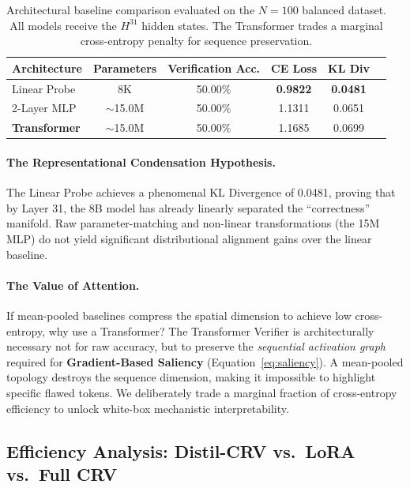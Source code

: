 \documentclass{article}
\begin{document}
\begin{table}[ht]
\centering
\caption{Architectural baseline comparison evaluated on the $N=100$ balanced dataset. All models receive the $H^{31}$ hidden states. The Transformer trades a marginal cross-entropy penalty for sequence preservation.}
\label{tab:architectural_baselines}
\vspace{3pt}
\begin{tabular}{@{}lccccc@{}}
\toprule
\textbf{Architecture} & \textbf{Parameters} & \textbf{Verification Acc.} & \textbf{CE Loss} & \textbf{KL Div} \\ \midrule
Linear Probe & 8K & 50.00\% & \textbf{0.9822} & \textbf{0.0481} \\
2-Layer MLP & $\sim$15.0M & 50.00\% & 1.1311 & 0.0651 \\
\textbf{Transformer} & $\sim$15.0M & 50.00\% & 1.1685 & 0.0699 \\ \bottomrule
\end{tabular}
\end{table}

\paragraph{The Representational Condensation Hypothesis.} The Linear Probe achieves a phenomenal KL Divergence of 0.0481, proving that by Layer 31, the 8B model has already linearly separated the ``correctness'' manifold. Raw parameter-matching and non-linear transformations (the 15M MLP) do not yield significant distributional alignment gains over the linear baseline.

\paragraph{The Value of Attention.} If mean-pooled baselines compress the spatial dimension to achieve low cross-entropy, why use a Transformer? The Transformer Verifier is architecturally necessary not for raw accuracy, but to preserve the \emph{sequential activation graph} required for \textbf{Gradient-Based Saliency} (Equation~\ref{eq:saliency}). A mean-pooled topology destroys the sequence dimension, making it impossible to highlight specific flawed tokens. We deliberately trade a marginal fraction of cross-entropy efficiency to unlock white-box mechanistic interpretability.

\subsection{Efficiency Analysis: Distil-CRV vs.\ LoRA vs.\ Full CRV}
\label{sec:efficiency}
\end{document}
